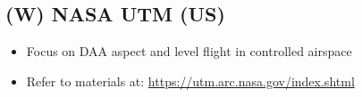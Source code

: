 \subsection{(W) NASA UTM (US)}\label{sec:NASAUtm}
\begin{itemize}
    \item Focus on DAA aspect and level flight in controlled airspace
    \item Refer to materials at: \url{https://utm.arc.nasa.gov/index.shtml}
\end{itemize}
